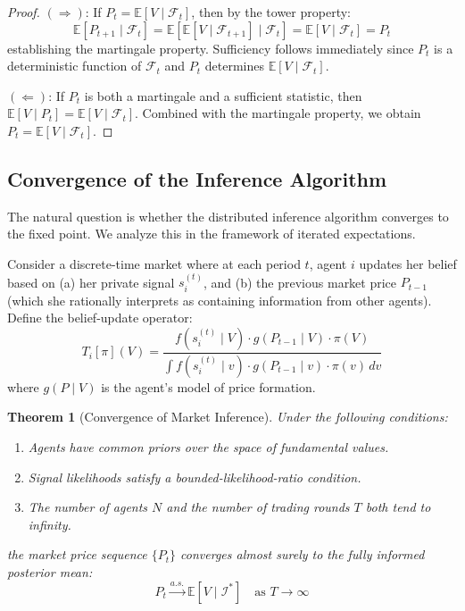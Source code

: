 \documentclass[12pt,a4paper]{article}
\newtheorem{theorem}{Theorem}[section]
\theoremstyle{definition}
\newcommand{\E}{\mathbb{E}}
\newcommand{\F}{\mathcal{F}}
\newcommand{\I}{\mathcal{I}}
\begin{document}
\begin{proof}
$(\Rightarrow)$: If $P_t = \E[V \mid \F_t]$, then by the tower property:
\[
\E[P_{t+1} \mid \F_t] = \E[\E[V \mid \F_{t+1}] \mid \F_t] = \E[V \mid \F_t] = P_t
\]
establishing the martingale property. Sufficiency follows immediately since $P_t$ is a deterministic function of $\F_t$ and $P_t$ determines $\E[V \mid \F_t]$.

$(\Leftarrow)$: If $P_t$ is both a martingale and a sufficient statistic, then $\E[V \mid P_t] = \E[V \mid \F_t]$. Combined with the martingale property, we obtain $P_t = \E[V \mid \F_t]$.
\end{proof}

\subsection{Convergence of the Inference Algorithm}

The natural question is whether the distributed inference algorithm converges to the fixed point. We analyze this in the framework of iterated expectations.

Consider a discrete-time market where at each period $t$, agent $i$ updates her belief based on (a) her private signal $s_i^{(t)}$, and (b) the previous market price $P_{t-1}$ (which she rationally interprets as containing information from other agents). Define the belief-update operator:
\begin{equation}\label{eq:belief_operator}
    T_i[\pi](V) = \frac{f(s_i^{(t)} \mid V) \cdot g(P_{t-1} \mid V) \cdot \pi(V)}{\int f(s_i^{(t)} \mid v) \cdot g(P_{t-1} \mid v) \cdot \pi(v) \, dv}
\end{equation}
where $g(P \mid V)$ is the agent's model of price formation.

\begin{theorem}[Convergence of Market Inference]\label{thm:convergence}
Under the following conditions:
\begin{enumerate}[label=(\roman*)]
    \item Agents have common priors over the space of fundamental values.
    \item Signal likelihoods satisfy a bounded-likelihood-ratio condition.
    \item The number of agents $N$ and the number of trading rounds $T$ both tend to infinity.
\end{enumerate}
the market price sequence $\{P_t\}$ converges almost surely to the fully informed posterior mean:
\begin{equation}
    P_t \xrightarrow{a.s.} \E[V \mid \I^*] \quad \text{as } T \to \infty
\end{equation}
\end{theorem}
\end{document}
